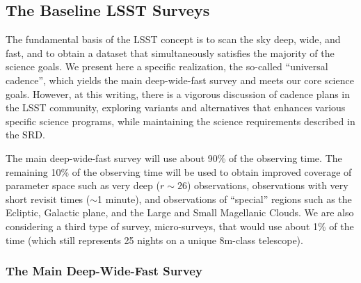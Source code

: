 \documentclass{emulateapj}
\begin{document}
\subsection{ The Baseline LSST Surveys }
\label{sec:baseline}

The fundamental basis of the LSST concept is to scan the sky deep, wide, and
fast, and to obtain a dataset that simultaneously satisfies the majority
of the science goals. We present here a specific realization, the
so-called ``universal cadence'', which yields the main deep-wide-fast
survey and meets our core science goals.  However, at this writing,
there is a vigorous discussion of cadence plans in the LSST community,
exploring variants and alternatives that enhances various specific
science programs, while maintaining the science requirements described
in the SRD.  

The main deep-wide-fast survey %
will use about 90\% of the observing time. The remaining 10\% of the observing 
time will be used to obtain improved coverage of parameter space such as 
very deep ($r\sim26$) observations, observations with very short revisit 
times ($\sim$1 minute), and observations of ``special'' regions such as the 
Ecliptic, Galactic plane, and the Large and Small Magellanic Clouds. 
We are also considering a third type of survey, micro-surveys, that would 
use about 1\% of the time (which still represents 25 nights on a unique 
8m-class telescope). 

\subsubsection{ The Main Deep-Wide-Fast Survey }
\end{document}
